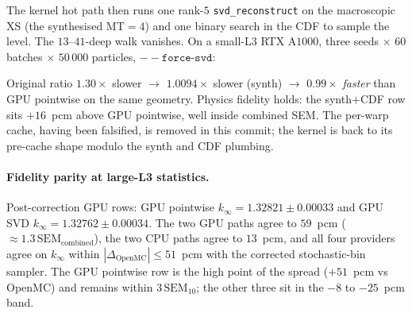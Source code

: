 The kernel hot path then runs one rank-$5$ \texttt{svd\_reconstruct}
on the macroscopic XS (the synthesised MT$=4$) and one binary search
in the CDF to sample the level. The $13$--$41$-deep walk vanishes.
On a small-L3 RTX A$1000$, three seeds $\times$ $60$ batches
$\times$ $50\,000$ particles, $\mathtt{-{}-force\text{-}svd}$:

\noindent{}


\noindent
Original ratio $1.30\times$ slower
$\to$ $1.0094\times$ slower (synth)
$\to$ $0.99\times$ \emph{faster} than GPU pointwise on the same
geometry. Physics fidelity holds: the synth$+$CDF row sits
$+16$~pcm above GPU pointwise, well inside combined SEM. The
per-warp cache, having been falsified, is removed in this commit;
the kernel is back to its pre-cache shape modulo the synth and CDF
plumbing.

\paragraph{Fidelity parity at large-L3 statistics.}
Post-correction GPU rows: GPU pointwise $k_\infty =
1.32821 \pm 0.00033$ and GPU SVD $k_\infty = 1.32762 \pm
0.00034$. The two GPU paths agree to $59$~pcm
($\approx 1.3\,\mathrm{SEM}_\text{combined}$), the two CPU
paths agree to $13$~pcm, and all four providers agree on
$k_\infty$ within $|\Delta_\text{OpenMC}| \le 51$~pcm with
the corrected stochastic-bin sampler. The GPU pointwise
row is the high point of the spread ($+51$~pcm vs OpenMC)
and remains within $3\,\mathrm{SEM}_{10}$; the other three
sit in the $-8$ to $-25$~pcm band.

